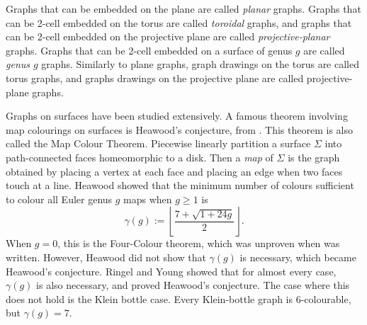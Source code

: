 Graphs that can be embedded on the plane are called \textit{planar} graphs. Graphs that can be 2-cell embedded on the torus are called \textit{toroidal} graphs, and graphs that can be 2-cell embedded on the projective plane are called \textit{projective-planar} graphs. Graphs that can be 2-cell embedded on a surface of genus $g$ are called \textit{genus $g$} graphs. Similarly to plane graphs, graph drawings on the torus are called torus graphs, and graphs drawings on the projective plane are called projective-plane graphs. 

Graphs on surfaces have been studied extensively. A famous theorem involving map colourings on surfaces is Heawood's conjecture, from \textcite{heawoodMapcolourTheorem1890}. This theorem is also called the Map Colour Theorem. Piecewise linearly partition a surface $\Sigma$ into path-connected faces homeomorphic to a disk. Then a \textit{map} of $\Sigma$ is the graph obtained by placing a vertex at each face and placing an edge when two faces touch at a line. Heawood showed that the minimum number of colours sufficient to colour all Euler genus $g$ maps when $g \geq 1$ is
	\begin{equation*}
		\gamma(g) := \left\lfloor 
		\frac{7 + \sqrt{1 + 24g}}{2}
		\right\rfloor.
	\end{equation*}
When $g = 0$, this is the Four-Colour theorem, which was unproven when \textcite{ringelMapColorTheorem1974} was written.  
However, Heawood did not show that $\gamma(g)$ is necessary, which became Heawood's conjecture. 
Ringel and Young \cite{ringelMapColorTheorem1974} showed that for almost every case, $\gamma(g)$ is also necessary, and proved Heawood's conjecture. The case where this does not hold is the Klein bottle case. Every Klein-bottle graph is $6$-colourable, but $\gamma(g) = 7$. 
